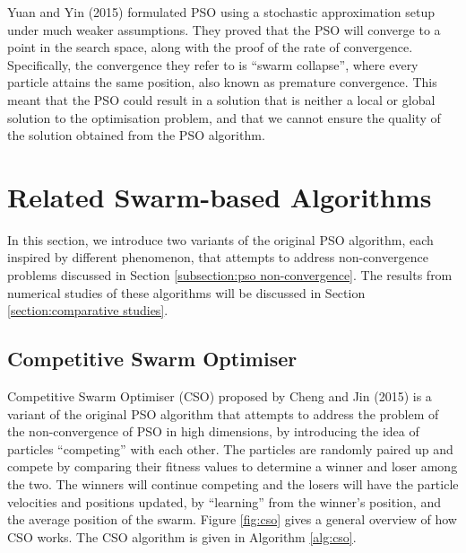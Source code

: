 \documentclass[12pt]{article}
\theoremstyle{definition}
\begin{document}
Yuan and Yin (2015) \cite{yuanyin2015} formulated PSO using a stochastic approximation setup under much weaker assumptions. They proved that the PSO will converge to a point in the search space, along with the proof of the rate of convergence. Specifically, the convergence they refer to is ``swarm collapse'', where every particle attains the same position, also known as premature convergence. This meant that the PSO could result in a solution that is neither a local or global solution to the optimisation problem, and that we cannot ensure the quality of the solution obtained from the PSO algorithm. \newline

\newpage

\section{Related Swarm-based Algorithms}
\label{section:related swarm algo}
In this section, we introduce two variants of the original PSO algorithm, each inspired by different phenomenon, that attempts to address non-convergence problems discussed in Section \ref{subsection:pso non-convergence}. The results from numerical studies of these algorithms will be discussed in Section \ref{section:comparative studies}.

\subsection{Competitive Swarm Optimiser}
Competitive Swarm Optimiser (CSO) proposed by Cheng and Jin (2015) \cite{chengjin2015} is a variant of the original PSO algorithm that attempts to address the problem of the non-convergence of PSO in high dimensions, by introducing the idea of particles ``competing'' with each other. The particles are randomly paired up and compete by comparing their fitness values to determine a winner and loser among the two. The winners will continue competing and the losers will have the particle velocities and positions updated, by ``learning'' from the winner's position, and the average position of the swarm. Figure \ref{fig:cso} gives a general overview of how CSO works. The CSO algorithm is given in Algorithm \ref{alg:cso}. \newline

\newpage
\end{document}
